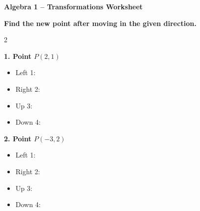 \documentclass[11pt]{article}
\begin{document}
\begin{center}
    {\Huge \textbf{Algebra 1 -- Transformations Worksheet}}
\end{center}

\vspace{0.3cm}


\begin{tcolorbox}[colback=blue!5,colframe=blue,title=\Large A. Warm Up -- Directions from a Point]

\textbf{Find the new point after moving in the given direction.}

\vspace{0.3cm}

\begin{multicols}{2}

\textbf{1. Point $P(2,1)$}

\begin{itemize}
    \item Left 1: \underline{\hspace{2cm}}
    \item Right 2: \underline{\hspace{2cm}}
    \item Up 3: \underline{\hspace{2cm}}
    \item Down 4: \underline{\hspace{2cm}}
\end{itemize}

\begin{center}
\end{center}

\columnbreak

\textbf{2. Point $P(-3,2)$}

\begin{itemize}
    \item Left 1: \underline{\hspace{2cm}}
    \item Right 2: \underline{\hspace{2cm}}
    \item Up 3: \underline{\hspace{2cm}}
    \item Down 4: \underline{\hspace{2cm}}
\end{itemize}


\end{multicols}
\end{tcolorbox}
\end{document}
